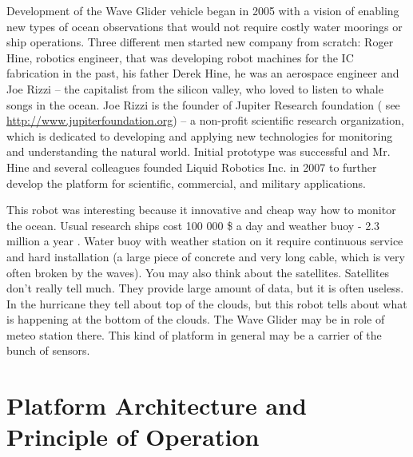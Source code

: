 



Development of the Wave Glider vehicle began in 2005 with a vision of enabling new types of ocean observations that would not require costly water moorings or ship operations. Three different men started new company from scratch: Roger Hine, robotics engineer, that was developing  robot machines for the IC fabrication in the past, his father Derek Hine, he was an aerospace engineer and Joe Rizzi – the capitalist from the silicon valley, who loved to listen to whale songs in the ocean. Joe Rizzi is the founder of  Jupiter Research foundation ( see \url{http://www.jupiterfoundation.org}) – a non-profit scientific research organization, which is dedicated to developing and applying new technologies for monitoring and understanding the natural world.
Initial prototype was successful and Mr. Hine and several colleagues founded Liquid Robotics Inc. in 2007 to further develop the platform for scientific, commercial, and military applications.


This robot was interesting because it innovative and cheap way how to monitor  the ocean. Usual research ships cost 100 000 \$  a  day and  weather buoy  -  2.3 million a year \cite{video:james_gosling_on_youtube}. Water buoy with weather station on it require continuous service and hard installation (a large piece of concrete and  very long cable, which is very often broken by the waves).
You may also think about the satellites. Satellites don't really tell much. They provide  large amount of  data, but it is often useless. In the hurricane they tell about top of the clouds, but this robot tells about what is happening at the bottom of the clouds. The Wave Glider may be in role of meteo station there.
This kind of platform in general may be a carrier of the bunch of sensors. 


\section{Platform Architecture and Principle of Operation}


